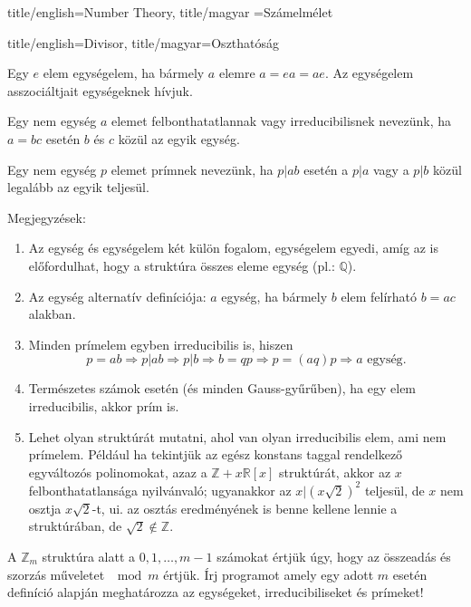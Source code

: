 \documentclass{amsbook}
\begin{document}
\begin{Part*}{
    title/english=Number Theory,
    title/magyar =Számelmélet}
\begin{Section}{
    title/english=Divisor,
    title/magyar=Oszthatóság}
  \begin{definition}[Egység] Egy $e$ elem egységelem, ha bármely $a$ elemre
    $a=ea=ae$. Az egységelem asszociáltjait egységeknek hívjuk.
  \end{definition}

  \begin{definition}[Irreducibilis] Egy nem egység $a$ elemet felbonthatatlannak vagy 
    irreducibilisnek nevezünk, ha $a=bc$ esetén $b$ és $c$ közül az 
    egyik egység.
  \end{definition}

  \begin{definition}[Prím] Egy nem egység $p$ elemet prímnek nevezünk, ha $p|ab$
    esetén a $p|a$ vagy a $p|b$ közül legalább az egyik teljesül.
  \end{definition}

  Megjegyzések:
  \begin{enumerate}
    \item Az egység és egységelem két külön fogalom, egységelem egyedi, 
      amíg az is előfordulhat, hogy a struktúra összes eleme egység (pl.: $\mathbb{Q}$).
    \item Az egység alternatív definíciója: $a$ egység, ha bármely $b$ elem
      felírható $b=ac$ alakban.
    \item Minden prímelem egyben irreducibilis is, hiszen \[
        p = ab \Rightarrow p|ab \Rightarrow p|b \Rightarrow b = qp \Rightarrow
        p = (aq)p \Rightarrow a \text{ egység}.
      \]
    \item Természetes számok esetén (és minden Gauss-gy\H ur\H uben), ha egy
      elem irreducibilis, akkor prím is.
    \item Lehet olyan struktúrát mutatni, ahol van olyan irreducibilis elem,
      ami nem prímelem. Például ha tekintjük az egész konstans taggal rendelkező
      egyváltozós polinomokat, azaz a $\mathbb{Z} + x\mathbb{R}[x]$ struktúrát,
      akkor az $x$ felbonthatatlansága nyilvánvaló; ugyanakkor az
      $x|(x\sqrt{2})^2$ teljesül, de $x$ nem osztja $x\sqrt{2}$-t, ui. az 
      osztás eredményének is benne kellene lennie a struktúrában, de 
      $\sqrt{2}\notin\mathbb{Z}$. 
  \end{enumerate}

  \begin{exercise} A $\mathbb{Z}_m$ struktúra alatt a ${0,1,\dots, m-1}$
    számokat értjük úgy, hogy az összeadás és szorzás műveletet $\mod m$ értjük.
    Írj programot amely egy adott $m$ esetén definíció alapján meghatározza az 
    egységeket, irreducibiliseket és prímeket!
  \end{exercise}


\end{Section}
\end{Part*}
\end{document}

